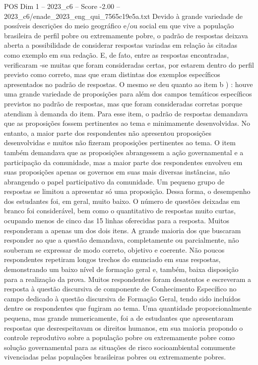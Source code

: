 \begin{textsample}{POS Dim 1 – 2023\_c6 – Score -2.00 – 2023\_c6/enade\_2023\_eng\_qui\_7565c19e5a.txt}
Devido à grande variedade de possíveis descrições do meio geográfico e/ou social em que vive a população brasileira de perfil pobre ou extremamente pobre, o padrão de respostas deixava aberta a possibilidade de considerar respostas variadas em relação às citadas como exemplo em sua redação.
E, de fato, entre as respostas encontradas, verificaram -se muitas que foram consideradas certas, por estarem dentro do perfil previsto como correto, mas que eram distintas dos exemplos específicos apresentados no padrão de respostas.
O mesmo se deu quanto ao item b ) : houve uma grande variedade de proposições para além dos campos temáticos específicos previstos no padrão de respostas, mas que foram consideradas corretas porque atendiam à demanda do item.
Para esse item, o padrão de respostas demandava que as proposições fossem pertinentes ao tema e minimamente desenvolvidas.
No entanto, a maior parte dos respondentes não apresentou proposições desenvolvidas e muitos não fizeram proposições pertinentes ao tema.
O item também demandava que as proposições abrangessem a ação governamental e a participação da comunidade, mas a maior parte dos respondentes envolveu em suas proposições apenas os governos em suas mais diversas instâncias, não abrangendo o papel participativo da comunidade.
Um pequeno grupo de respostas se limitou a apresentar só uma proposição.
Dessa forma, o desempenho dos estudantes foi, em geral, muito baixo.
O número de questões deixadas em branco foi considerável, bem como o quantitativo de respostas muito curtas, ocupando menos de cinco das 15 linhas oferecidas para a resposta.
Muitos responderam a apenas um dos dois itens.
A grande maioria dos que buscaram responder ao que a questão demandava, completamente ou parcialmente, não souberam se expressar de modo correto, objetivo e coerente.
Não poucos respondentes repetiram longos trechos do enunciado em suas respostas, demonstrando um baixo nível de formação geral e, também, baixa disposição para a realização da prova.
Muitos respondentes foram desatentos e escreveram a resposta à questão discursiva de componente de Conhecimento Específico no campo dedicado à questão discursiva de Formação Geral, tendo sido incluídos dentre os respondentes que fugiram ao tema.
Uma quantidade proporcionalmente pequena, mas grande numericamente, foi a de estudantes que apresentaram respostas que desrespeitavam os direitos humanos, em sua maioria propondo o controle reprodutivo sobre a população pobre ou extremamente pobre como solução governamental para as situações de risco socioambiental comumente vivenciadas pelas populações brasileiras pobres ou extremamente pobres.

\end{textsample}
